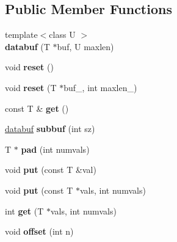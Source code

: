 \subsection*{Public Member Functions}
\begin{DoxyCompactItemize}
\item 
\mbox{\label{structdatabuf_af4e9590924e4b7d1c4a73a0d8060dfee}} 
{\footnotesize template$<$class U $>$ }\\{\bfseries databuf} (T $\ast$buf, U maxlen)
\item 
\mbox{\label{structdatabuf_ae8438cb4176e0ef2c7f84a6f891d0928}} 
void {\bfseries reset} ()
\item 
\mbox{\label{structdatabuf_a97129b48c69981fc8581dd16eabe6622}} 
void {\bfseries reset} (T $\ast$buf\+\_\+, int maxlen\+\_\+)
\item 
\mbox{\label{structdatabuf_aa7f496dc497379a8ceb61f1d359c4cfe}} 
const T \& {\bfseries get} ()
\item 
\mbox{\label{structdatabuf_a531caf46f8bf35bb2a16b4e7bc294b6c}} 
\hyperlink{structdatabuf}{databuf} {\bfseries subbuf} (int sz)
\item 
\mbox{\label{structdatabuf_a62a0a7a3ec876a9a33d10c9e98cddf82}} 
T $\ast$ {\bfseries pad} (int numvals)
\item 
\mbox{\label{structdatabuf_a4ddb1dbc1bcc6e5c589bb248060b2e24}} 
void {\bfseries put} (const T \&val)
\item 
\mbox{\label{structdatabuf_aa22fdfb9de579e0aa2a95b413f7aa9fe}} 
void {\bfseries put} (const T $\ast$vals, int numvals)
\item 
\mbox{\label{structdatabuf_ad1955ab60fbf7b6eb7a778c9361fe77d}} 
int {\bfseries get} (T $\ast$vals, int numvals)
\item 
\mbox{\label{structdatabuf_ad5b5187b99d3dab4242ae6305b2d703c}} 
void {\bfseries offset} (int n)
\item 
\mbox{\label{structdatabuf_aabe7049430ef398a4ae0d4dce7902277}} 

\end{DoxyCompactItemize}
